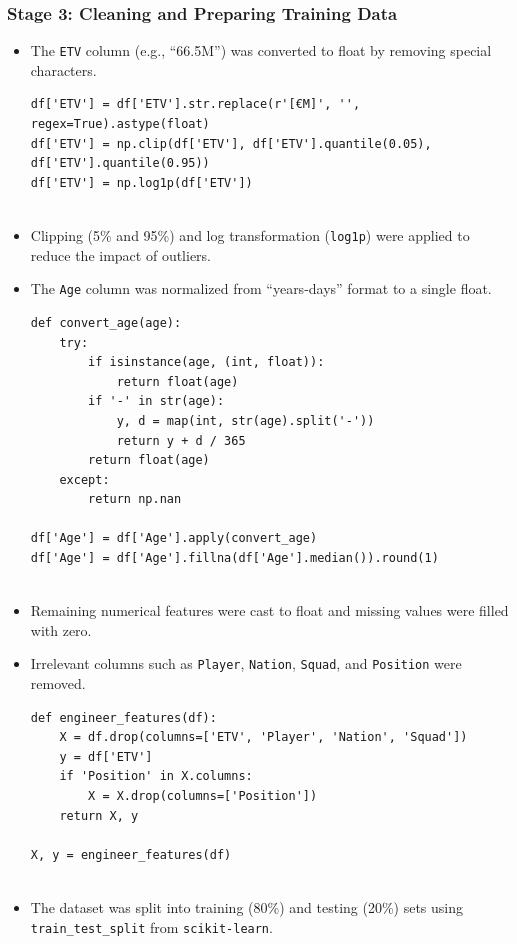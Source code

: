 \documentclass[12pt,a4paper]{article}
\begin{document}
\subsubsection{Stage 3: Cleaning and Preparing Training Data}
\begin{itemize}
    \item The \texttt{ETV} column (e.g., ``66.5M'') was converted to float by removing special characters.
\begin{verbatim}
df['ETV'] = df['ETV'].str.replace(r'[€M]', '', regex=True).astype(float)
df['ETV'] = np.clip(df['ETV'], df['ETV'].quantile(0.05), df['ETV'].quantile(0.95))
df['ETV'] = np.log1p(df['ETV'])
    
\end{verbatim}
    \item Clipping (5\% and 95\%) and log transformation (\texttt{log1p}) were applied to reduce the impact of outliers.
    \item The \texttt{Age} column was normalized from ``years-days'' format to a single float.
\begin{verbatim}
def convert_age(age):
    try:
        if isinstance(age, (int, float)):
            return float(age)
        if '-' in str(age):
            y, d = map(int, str(age).split('-'))
            return y + d / 365
        return float(age)
    except:
        return np.nan

df['Age'] = df['Age'].apply(convert_age)
df['Age'] = df['Age'].fillna(df['Age'].median()).round(1)
    
\end{verbatim}
    \item Remaining numerical features were cast to float and missing values were filled with zero.
    \item Irrelevant columns such as \texttt{Player}, \texttt{Nation}, \texttt{Squad}, and \texttt{Position} were removed.
\begin{verbatim}
def engineer_features(df):
    X = df.drop(columns=['ETV', 'Player', 'Nation', 'Squad'])
    y = df['ETV']
    if 'Position' in X.columns:
        X = X.drop(columns=['Position'])
    return X, y

X, y = engineer_features(df)
    
\end{verbatim}
    \item The dataset was split into training (80\%) and testing (20\%) sets using \texttt{train\_test\_split} from \texttt{scikit-learn}.
\end{itemize}
\end{document}
